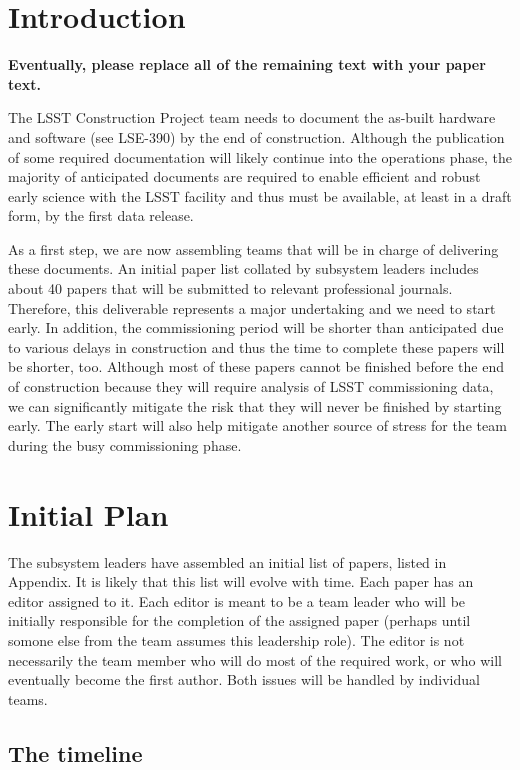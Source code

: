 \section{Introduction}

{\bf Eventually, please replace all of the remaining text with your paper text.}
\vskip 0.4in


The LSST Construction Project team needs to document the as-built hardware and software
(see LSE-390) by the end of construction. Although the publication of some required documentation
will likely continue into the operations phase, the majority of anticipated documents are required
to enable efficient and robust early science with the LSST facility and thus must be available, at least 
in a draft form, by the first data release. 

As a first step, we are now assembling teams that will be in charge of delivering these documents.
An initial paper list collated by subsystem leaders includes about 40 papers that will be submitted 
to relevant professional journals. Therefore, this deliverable represents a major undertaking
and we need to start early. In addition, the commissioning period will be shorter than anticipated 
due to various delays in construction  and thus the time to complete these papers will be
shorter, too. Although most of these papers cannot be finished before the end of construction 
because they will require analysis of LSST commissioning data, we can significantly mitigate
the risk that they will never be finished by starting early. The early start will also help 
mitigate another source of stress for the team during the busy commissioning phase. 
 
\section{Initial Plan} 

The subsystem leaders have assembled an initial list of papers, listed in Appendix. 
It is likely that this list will evolve with time. 
Each paper has an editor assigned to it. Each editor is meant to be a team leader
who will be initially responsible for the completion of the assigned paper (perhaps 
until somone else from the team assumes this leadership role). The editor is not 
necessarily the team member who will do most of the required work, or who will 
eventually become the first author. Both issues will be handled by individual teams. 

\subsection{The timeline} 

